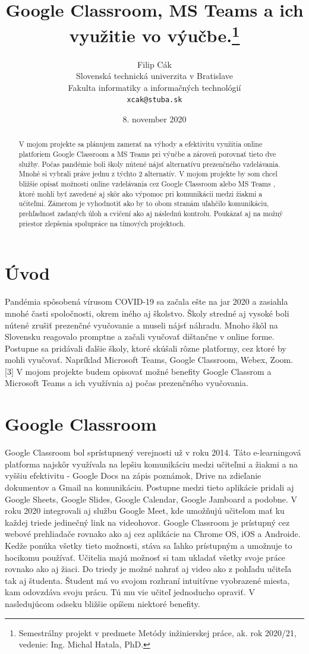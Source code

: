 \documentclass[10pt,slovak,a4paper]{article}
\title{Google Classroom,  MS Teams a ich využitie vo výučbe.\thanks{Semestrálny projekt v predmete Metódy inžinierskej práce, ak. rok 2020/21, vedenie: Ing. Michal Hatala, PhD. }}
\author{Filip Cák\\[2pt]
	{\small Slovenská technická univerzita v Bratislave}\\
	{\small Fakulta informatiky a informačných technológií}\\
	{\small \texttt{xcak@stuba.sk}}
	}
\date{\small 8. november 2020}
\begin{document}
\maketitle

\begin{abstract}
V mojom projekte sa plánujem zamerať na výhody a efektivitu využitia online platforiem Google Classroom a MS Teams pri výučbe a zároveň porovnať tieto dve služby. Počas pandémie boli školy nútené nájsť alternatívu prezenčného vzdelávania. Mnohé si vybrali práve jednu z týchto 2 alternatív. \cite {COVID-19clanok} V mojom projekte by som chcel bližšie opísať možnosti online vzdelávania cez Google Classroom alebo MS Teams \cite {porovnanie}, ktoré mohli byť zavedené aj skôr ako výpomoc pri komunikácii medzi žiakmi a učiteľmi. Zámerom je vyhodnotiť ako by to obom stranám uľahčilo komunikáciu, prehľadnosť zadaných úloh a cvičení ako aj následnú kontrolu. Poukázať aj na možný priestor zlepšenia spolupráce na tímových projektoch.
\end{abstract}



\section{Úvod}
Pandémia spôsobená vírusom COVID-19 sa začala ešte na jar 2020 a zasiahla mnohé časti spoločnosti, okrem iného aj školstvo. Školy stredné aj vysoké boli nútené zrušiť prezenčné vyučovanie a museli nájsť náhradu. Mnoho škôl na Slovensku reagovalo promptne a začali vyučovať dištančne v online forme. Postupne sa pridávali ďalšie školy, ktoré skúšali rôzne platformy, cez ktoré by mohli vyučovať. Napríklad Microsoft Teams, Google Classroom, Webex, Zoom. [3] V mojom projekte budem opisovať možné benefity Google Classrom a Microsoft Teams a ich využívnia aj počas prezenčného vyučovania. 

\section{Google Classroom} \label{Google Classroom}

Google Classroom bol sprístupnený verejnosti už v roku 2014. \cite {release_date} Táto e-learningová platforma najskôr využívala na lepšiu komunikáciu medzi učiteľmi a žiakmi a na vyššiu efektivitu - Google Docs na zápis poznámok, Drive na zdieľanie dokumentov a Gmail na komunikáciu. Postupne medzi tieto aplikácie pridali aj Google Sheets, Google Slides, Google Calendar, Google Jamboard a podobne. V roku 2020 integrovali aj službu Google Meet, kde umožňujú učiteľom mať ku každej triede jedinečný link na videohovor. Google Classroom je prístupný cez webové prehliadače rovnako ako aj cez aplikácie na Chrome OS, iOS a Androide. Kedže ponúka všetky tieto možnosti, stáva sa ľahko prístupným a umožnuje to hocikomu používať. \cite {COVID-19clanok} Učitelia majú možnosť si tam ukladať všetky svoje práce rovnako ako aj žiaci. Do triedy je možné nahrať aj video ako z pohľadu učiteľa tak aj študenta. Študent má vo svojom rozhraní intuitívne vyobrazené miesta, kam odovzdáva svoju prácu. Tú mu vie učiteľ jednoducho opraviť. V nasledujúcom odseku bližšie opíšem niektoré benefity.
\end{document}

